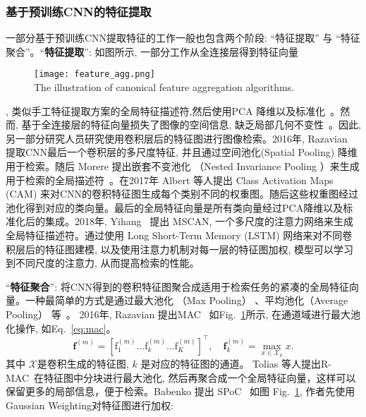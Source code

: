 \subsubsection{基于预训练CNN的特征提取}
一部分基于预训练CNN提取特征的工作一般也包含两个阶段: ``特征提取'' 与 ``特征聚合''。``\textbf{特征提取}'': 如图所示, 一部分工作从全连接层得到特征向量
\begin{figure}[!htp]
    \centering
    \texttt{[image: feature\_agg.png]} \\
      {The illustration of canonical feature aggregation algorithms.}
   \label{fig:featureagg}
\end{figure}
, 类似手工特征提取方案的全局特征描述符,然后使用PCA 降维以及标准化~\cite{sharif2014cnn,gong2014multi}。然而, 基于全连接层的特征向量损失了图像的空间信息, 缺乏局部几何不变性~\cite{gong2014multi}。因此, 另一部分研究人员研究使用卷积层后的特征图进行图像检索。2016年, Razavian~\cite{razavian2016visual} 提取CNN最后一个卷积层的多尺度特征, 并且通过空间池化(Spatial Pooling) 降维用于检索。随后 Morere 提出嵌套不变池化 （Nested Invariance Pooling ）来生成用于检索的全局描述符~\cite{morere2017nested}。在2017年 Albert \cite{jimenez2017class} 等人提出 Class Activation Maps (CAM) 来对CNN的卷积特征图生成每个类别不同的权重图。随后这些权重图经过池化得到对应的类向量。最后的全局特征向量是所有类向量经过PCA降维以及标准化后的集成。2018年, Yihang~\cite{lou2018multi} 提出 MSCAN, 一个多尺度的注意力网络来生成全局特征描述符。通过使用 Long Short-Term Memory (LSTM) 网络来对不同卷积层后的特征图建模, 以及使用注意力机制对每一层的特征图加权, 模型可以学习到不同尺度的注意力, 从而提高检索的性能。\par
``\textbf{特征聚合}'': 将CNN得到的卷积特征图聚合成适用于检索任务的紧凑的全局特征向量。一种最简单的方式是通过最大池化 （Max Pooling） 、平均池化（Average Pooling） 等~\cite{razavian2016visual, pang2018unifying}。
2016年, Razavian 提出MAC~\cite{razavian2016visual} 如Fig.~\ref{fig:featureagg}所示, 在通道域进行最大池化操作, 如Eq.~\ref{eq:mac}。
\begin{equation}
    \mathbf{f}^{(m)}=\left[\mathrm{f}_1^{(m)} \ldots \mathrm{f}_k^{(m)} \ldots \mathrm{f}_K^{(m)}\right]^{\top}, \quad \mathbf{f}_k^{(m)}=\max _{x \in \mathcal{X}_k} x.
    \label{eq:mac}
\end{equation}
其中 $\mathcal{X}$是卷积生成的特征图, $k$ 是对应的特征图的通道。
Tolias 等人提出R-MAC~\cite{tolias2015particular}在特征图中分块进行最大池化, 然后再聚合成一个全局特征向量，这样可以保留更多的局部信息，便于检索。Babenko 提出 SPoC~\cite{babenko2015aggregating} 如图 Fig.~\ref{fig:featureagg}, 作者先使用Gaussian Weighting对特征图进行加权:
